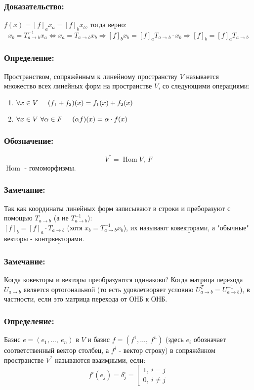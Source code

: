 \documentclass[12pt, letterpaper, twoside]{article}
\newcommand{\Underl}[1]{$\underline{\text{#1}}$}
\newcommand{\Hom}{\operatorname{Hom}}
\begin{document}
\subsubsection*{Доказательство:}
    $f(x) = [f]_a x_a = [f]_b x_b$, тогда верно:
\[x_b = T_{a\to b}^{-1} x_a \Leftrightarrow x_a = T_{a\to b} x_b\Rightarrow [f]_b x_b = [f]_a T_{a\to b}\cdot x_b\Rightarrow [f]_b = [f]_a T_{a\to b}\]
\subsubsection*{Определение:}
    Пространством, сопряжённым к линейному пространству $V$ называется множество всех линейных форм на пространстве $V$, со следующими операциями:
\begin{enumerate}
    \item $\forall x\in V\hspace{0.5cm} (f_1 + f_2)(x) = f_1(x) + f_2(x)$
    \item $\forall x\in V\ \forall \alpha \in F\hspace{0.5cm} (\alpha f)(x) = \alpha\cdot f(x)$
\end{enumerate}
\subsubsection*{Обозначение:}
\[V^* = \Hom{V,\ F}\]
    $\Hom$ - гомоморфизмы.
\subsubsection*{Замечание:}
    Так как координаты линейных форм записывают в строки и преборазуют с помощью $T_{a\to b}$ (а не $T_{a\to b}^{-1}$):\\
    $[f]_b = [f]_a\cdot T_{a\to b}$ (хотя $x_b = T_{a\to b}^{-1} x_b$), их называют \Underl{ковекторами}, а "обычные" векторы - \Underl{контрвекторами}.
\subsubsection*{Замечание:}
    Когда ковекторы и векторы преобразуются одинаково? Когда матрица перехода $U_{a\to b}$ является ортогональной (то есть удовлетворяет условию $U_{a\to b}^T = U_{a\to b}^{-1}$), в частности, если это матрица перехода от ОНБ к ОНБ.
\subsubsection*{Определение:}
    Базис $e = (e_1,\dots,\ e_n)$ в $V$ и базис $f = (f^1,\dots,\ f^n)$ (здесь $e_i$ обозначает соответственный вектор столбец, а $f^i$ - вектор строку) в сопряжённом пространстве $V^*$ называются \Underl{взаимными}, если:
\[f^i(e_j) = \delta_j^i = \left[\begin{matrix}
    1,\ i = j\\
    0,\ i\neq j
\end{matrix} \right.\]
\end{document}
